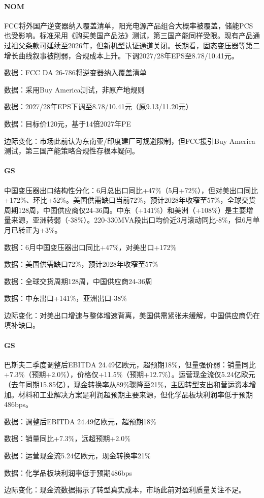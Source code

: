 \documentclass[11pt]{ctexart}
\begin{document}
\paragraph{NOM} FCC将外国产逆变器纳入覆盖清单，阳光电源产品组合大概率被覆盖，储能PCS也受影响。标准采用《购买美国产品法》测试，第三国产能同样受限。现有产品通过祖父条款可延续至2026年，但新机型认证通道关闭。长期看，固态变压器等第二增长曲线叙事被削弱，合规成本上升。下调2027/28年EPS至8.78/10.41元。
{\small\color{refgray}数据：FCC DA 26-786将逆变器纳入覆盖清单\par}
{\small\color{refgray}数据：采用Buy America测试，非原产地规则\par}
{\small\color{refgray}数据：2027/28年EPS下调至8.78/10.41元（原9.13/11.20元）\par}
{\small\color{refgray}数据：目标价120元，基于14倍2027年PE\par}
{\small\color{refgray}边际变化：市场此前认为东南亚/印度建厂可规避限制，但FCC援引Buy America测试，第三国产能策略合规性存根本疑问。\par}
\paragraph{GS} 中国变压器出口结构性分化：6月总出口同比+47\%（5月+72\%），但对美出口同比+172\%、环比+52\%。美国供需缺口当前72\%，预计2028年收窄至57\%，全球交货周期128周，中国供应商仅24-36周。中东（+141\%）和美洲（+108\%）是主要增量来源，亚洲转弱（-38\%）。220-330MVA段出口均价近3月滚动同比-8\%，但6月单月已转正为+3\%。
{\small\color{refgray}数据：6月中国变压器出口同比+47\%，对美出口+172\%\par}
{\small\color{refgray}数据：美国供需缺口72\%，预计2028年收窄至57\%\par}
{\small\color{refgray}数据：全球交货周期128周，中国供应商24-36周\par}
{\small\color{refgray}数据：中东出口+141\%，亚洲出口-38\%\par}
{\small\color{refgray}边际变化：对美出口增速与整体增速背离，美国供需紧张未缓解，中国供应商仍在填补缺口。\par}
\paragraph{GS} 巴斯夫二季度调整后EBITDA 24.49亿欧元，超预期18\%，但量强价弱：销量同比+7.3\%（预期+2.0\%），价格仅+11.5\%（预期+12.7\%）。运营现金流仅5.24亿欧元（去年同期15.85亿），现金转换率从89\%骤降至21\%，主因转型支出和营运资本增加。材料和工业解决方案是利润超预期主要来源，但化学品板块利润率低于预期486bps。
{\small\color{refgray}数据：调整后EBITDA 24.49亿欧元，超预期18\%\par}
{\small\color{refgray}数据：销量同比+7.3\%，远超预期+2.0\%\par}
{\small\color{refgray}数据：运营现金流5.24亿欧元，现金转换率21\%\par}
{\small\color{refgray}数据：化学品板块利润率低于预期486bps\par}
{\small\color{refgray}边际变化：现金流数据揭示了转型真实成本，市场此前对盈利质量关注不足。\par}
\end{document}
